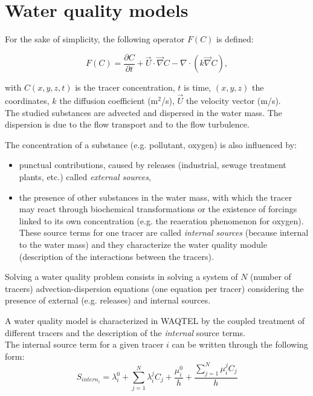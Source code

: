 \chapter{Water quality models}
\label{waq_models}
For the sake of simplicity, the following operator $F(C)$ is defined:

\begin{equation}
  F(C) = \frac{\partial C}{\partial t} + \vec{U} \cdot \vec \nabla C
       - \nabla \cdot \left( k \vec \nabla C \right),
\end{equation}

with $C(x,y,z,t)$ is the tracer concentration,
$t$ is time, $(x,y,z)$ the coordinates,
$k$ the diffusion coefficient (m$^2$/s),
$\vec{U}$ the velocity vector (m/s).\\


The studied substances are advected and dispersed in the water mass.
The dispersion is due to the flow transport and to the flow turbulence.

The concentration of a substance (e.g. pollutant, oxygen) is also influenced by:
\begin{itemize}
\item punctual contributions, caused by releases (industrial, sewage treatment plants, etc.)
  called \emph{external sources},
\item the presence of other substances in the water mass, with which the tracer
  may react through biochemical transformations or the existence of forcings
  linked to its own concentration (e.g. the reaeration phenomenon for oxygen).
  These source terms for one tracer are called \emph{internal sources}
  (because internal to the water mass) and they characterize the water quality module
  (description of the interactions between the tracers).
\end{itemize}

Solving a water quality problem consists in solving a system of $N$ (number of tracers)
advection-dispersion equations (one equation per tracer) considering the presence of
external (e.g. releases) and internal sources.

A water quality model is characterized in WAQTEL by the coupled treatment of different tracers
and the description of the \emph{internal} source terms.\\

The internal source term for a given tracer $i$ can be written through the following form:
\begin{equation}
  S_{intern_i} = \lambda_i^0 + \sum_{j=1}^{N} \lambda_i^j C_j + \frac{\mu_i^0}{h}
               + \frac{\sum_{j=1}^{N}\mu_i^j C_j}{h}
\end{equation}

